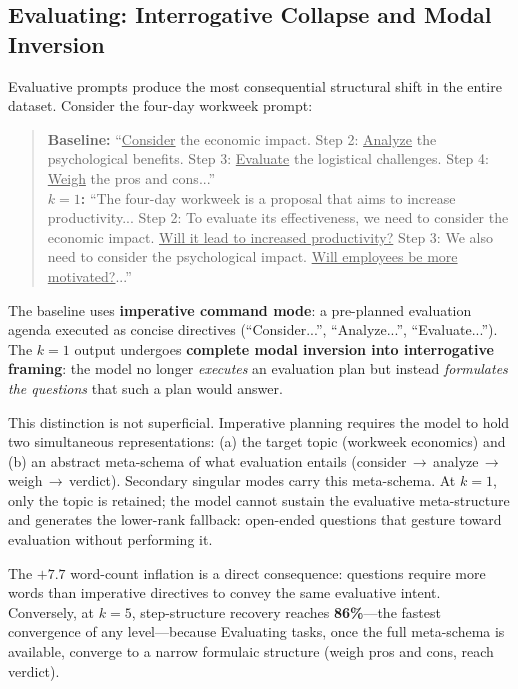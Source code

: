 \subsection{Evaluating: Interrogative Collapse and Modal Inversion}
\label{sec:evaluating}

Evaluative prompts produce the most consequential structural shift in the entire dataset.
Consider the four-day workweek prompt:

\begin{quote}
\small
\textbf{Baseline:} ``\underline{Consider} the economic impact. Step 2: \underline{Analyze} the psychological benefits.
Step 3: \underline{Evaluate} the logistical challenges. Step 4: \underline{Weigh} the pros and cons...'' \\[4pt]
\textbf{$k=1$:}  ``The four-day workweek is a proposal that aims to increase productivity...
Step 2: To evaluate its effectiveness, we need to consider the economic impact.
\underline{Will it lead to increased productivity?} Step 3: We also need to consider the psychological impact.
\underline{Will employees be more motivated?}...''
\end{quote}

The baseline uses \textbf{imperative command mode}: a pre-planned evaluation agenda executed as
concise directives (``Consider...'', ``Analyze...'', ``Evaluate...''). 
The $k=1$ output undergoes \textbf{complete modal inversion into interrogative framing}:
the model no longer \textit{executes} an evaluation plan but instead \textit{formulates the questions}
that such a plan would answer.

This distinction is not superficial.
Imperative planning requires the model to hold two simultaneous representations:
(a) the target topic (workweek economics) and (b) an abstract meta-schema of what evaluation
entails (consider\,$\to$\,analyze\,$\to$\,weigh\,$\to$\,verdict).
Secondary singular modes carry this meta-schema.
At $k=1$, only the topic is retained; the model cannot sustain the evaluative meta-structure
and generates the lower-rank fallback: open-ended questions that gesture toward evaluation
without performing it.

The $+7.7$ word-count inflation is a direct consequence: questions require more words
than imperative directives to convey the same evaluative intent.
Conversely, at $k=5$, step-structure recovery reaches \textbf{86\%}---the fastest convergence
of any level---because Evaluating tasks, once the full meta-schema is available,
converge to a narrow formulaic structure (weigh pros and cons, reach verdict).


